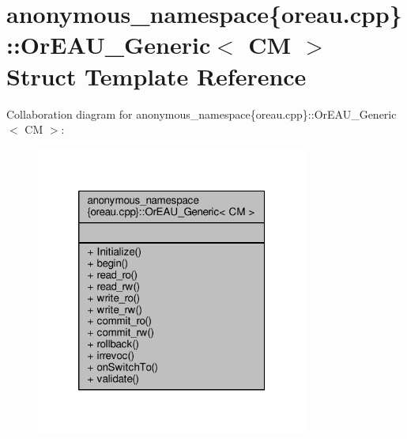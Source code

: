 \hypertarget{structanonymous__namespace_02oreau_8cpp_03_1_1OrEAU__Generic}{\section{anonymous\-\_\-namespace\{oreau.\-cpp\}\-:\-:Or\-E\-A\-U\-\_\-\-Generic$<$ C\-M $>$ Struct Template Reference}
\label{structanonymous__namespace_02oreau_8cpp_03_1_1OrEAU__Generic}
}


Collaboration diagram for anonymous\-\_\-namespace\{oreau.\-cpp\}\-:\-:Or\-E\-A\-U\-\_\-\-Generic$<$ C\-M $>$\-:
\nopagebreak
\begin{figure}[H]
\begin{center}
\leavevmode
\includegraphics[width=254pt]{structanonymous__namespace_02oreau_8cpp_03_1_1OrEAU__Generic__coll__graph}
\end{center}
\end{figure}
